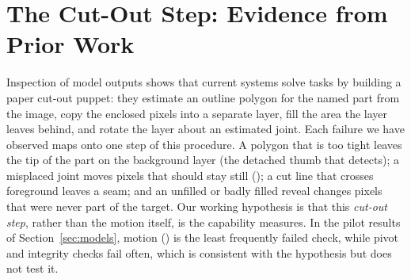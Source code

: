 
\providecommand{\cutrr}{\raggedright}

\section{The Cut-Out Step: Evidence from Prior Work}
\label{sec:cutout}

Inspection of model outputs shows that current systems solve \anibench{} tasks by building a paper cut-out puppet: they estimate an outline polygon for the named part from the image, copy the enclosed pixels into a separate layer, fill the area the layer leaves behind, and rotate the layer about an estimated joint. Each failure we have observed maps onto one step of this procedure. A polygon that is too tight leaves the tip of the part on the background layer (the detached thumb that  detects); a misplaced joint moves pixels that should stay still (); a cut line that crosses foreground leaves a seam; and an unfilled or badly filled reveal changes pixels that were never part of the target. Our working hypothesis is that this \emph{cut-out step}, rather than the motion itself, is the capability \anibench{} measures. In the pilot results of Section~\ref{sec:models}, motion () is the least frequently failed check, while pivot and integrity checks fail often, which is consistent with the hypothesis but does not test it.

